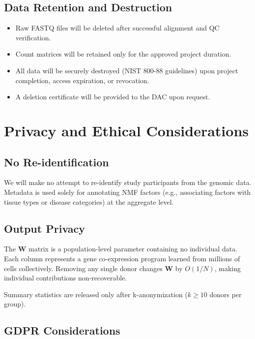 \documentclass[11pt,a4paper]{article}
\begin{document}
\subsection{Data Retention and Destruction}

\begin{itemize}[nosep]
    \item Raw FASTQ files will be deleted after successful alignment
          and QC verification.
    \item Count matrices will be retained only for the approved project
          duration.
    \item All data will be securely destroyed (NIST 800-88 guidelines)
          upon project completion, access expiration, or revocation.
    \item A deletion certificate will be provided to the DAC upon
          request.
\end{itemize}

\section{Privacy and Ethical Considerations}

\subsection{No Re-identification}

We will make no attempt to re-identify study participants from the
genomic data. Metadata is used solely for annotating NMF factors
(e.g., associating factors with tissue types or disease categories)
at the aggregate level.

\subsection{Output Privacy}

The $\mathbf{W}$ matrix is a population-level parameter containing no
individual data. Each column represents a gene co-expression program
learned from millions of cells collectively. Removing any single donor
changes $\mathbf{W}$ by $O(1/N)$, making individual contributions
non-recoverable.

Summary statistics are released only after k-anonymization ($k \geq 10$
donors per group).

\subsection{GDPR Considerations}
\end{document}
